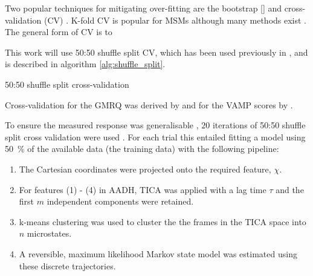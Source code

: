 Two popular techniques for mitigating over-fitting are the bootstrap [] and cross-validation (CV) \cite{friedman2001elements}. K-fold CV is popular for MSMs \cite{schererVariationalSelectionFeatures2019}\cite{mcgibbonVariationalCrossvalidationSlow2015} although many methods exist \cite{arlotSurveyCrossvalidationProcedures2009}. The general form of CV is to 

This work will use 50:50 shuffle split CV, which has been used previously in  \cite{chenDynamicConformationalLandscape2019}\cite{husicOptimizedParameterSelection2016}, and is described in algorithm \ref{alg:shuffle_split}. 

\begin{algorithm}\label{alg:shuffle_split}
\BlankLine
{}
\caption{50:50 shuffle split cross-validation}
\end{algorithm}

Cross-validation for the GMRQ was derived by \cite{mcgibbonVariationalCrossvalidationSlow2015} and for the VAMP scores by \cite{wuVariationalApproachLearning2019}. 

To ensure the  measured response was generalisable \cite{friedman2001elements}, $20$ iterations of 50:50 shuffle split cross validation were used \cite{husicOptimizedParameterSelection2016}. For each trial this entailed fitting a model using \SI{50}{\percent} of the available data (the training data) with the following pipeline:

\begin{enumerate}
    \item \label{lst:modfititem1} The Cartesian coordinates were projected onto the required feature, $\chi$. 
    \item \label{lst:modfititem2} For features (1) - (4) in AADH, TICA was applied with a lag time $\tau$ and the first $m$ independent  components were retained. 
    \item \label{lst:modfititem3} k-means clustering \cite{friedman2001elements} was used to cluster the the frames in the TICA space into $n$ microstates.
    \item \label{lst:modfititem4} A reversible, maximum likelihood Markov state model was estimated using these discrete trajectories. 
\end{enumerate}

